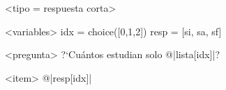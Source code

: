 <tipo = respuesta corta>

<variables>
idx = choice([0,1,2])
resp = [si, sa, sf]

<pregunta>
?`Cu\'antos estudian solo @|lista[idx]|?

<item>
@|resp[idx]|
